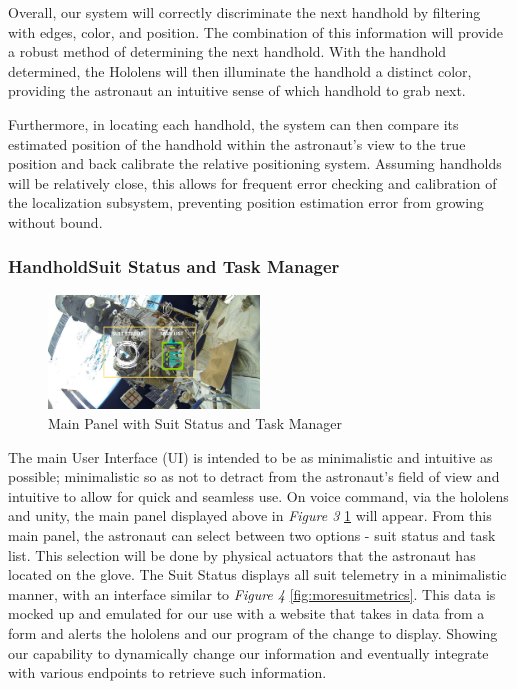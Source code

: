\documentclass{article}
\let\Oldsubsubsection\subsubsection
\renewcommand{\subsubsection}{\FloatBarrier\Oldsubsubsection}
\begin{document}
Overall, our system will correctly discriminate the next handhold by 
filtering with edges, color, and position. The combination of this 
information will provide a robust method of determining the next 
handhold. With the handhold determined, the Hololens will then 
illuminate the handhold a distinct color, providing the astronaut an 
intuitive sense of which handhold to grab next.

Furthermore, in locating each handhold, the system can then compare its 
estimated position of the handhold within the astronaut’s view to the 
true position and back calibrate the relative positioning system. 
Assuming handholds will be relatively close, this allows for frequent 
error checking and calibration of the localization subsystem, preventing 
position estimation error from growing without bound.

\subsubsection{HandholdSuit Status and Task Manager}

\begin{figure}[!htb]
  \centering
  \includegraphics[width=0.5\textwidth]{assets/suitdatatasklist.png}
  \caption{Main Panel with Suit Status and Task Manager}
  \label{fig:suitdatatasklist}
\end{figure}

The main User Interface (UI) is intended to be as minimalistic and 
intuitive as possible; minimalistic so as not to detract from the 
astronaut’s field of view and intuitive to allow for quick and seamless 
use. On voice command, via the hololens and unity, the main panel 
displayed above in \textit{Figure 3} \ref{fig:suitdatatasklist} will 
appear. From this main panel, the astronaut can select between two 
options - suit status and task list. This selection will be done by 
physical actuators that the astronaut has located on the glove. The Suit 
Status displays all suit telemetry in a minimalistic manner, with an 
interface similar to \textit{Figure 4} \ref{fig:moresuitmetrics}. This 
data is mocked up and emulated for our use with a website that takes in 
data from a form and alerts the hololens and our program of the change 
to display. Showing our capability to dynamically change our information 
and eventually integrate with various endpoints to retrieve such 
information.
\end{document}
